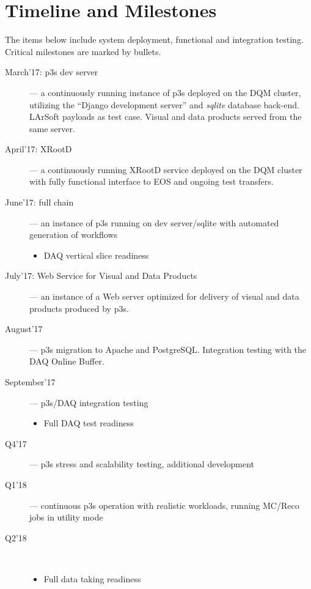 \documentclass[pdftex,12pt,letter]{article}
\begin{document}
\noindent 

\section{Timeline and Milestones}

The items below include system deployment, functional and integration testing.
Critical milestones are marked by bullets.

\begin{description}

\item[March'17: p3s dev server] --- a continuously running instance of p3s deployed on the DQM cluster,
utilizing the ``Django development server'' and \textit{sqlite} database back-end. LArSoft payloads as
test case. Visual and data products served from the same server.

\item[April'17: XRootD] --- a continuously running XRootD service deployed on the DQM cluster with
fully functional interface to EOS and ongoing test transfers.

\item[June'17: full chain] --- an instance of p3s running on dev server/sqlite with automated
generation of workflows
\begin{itemize}
\item DAQ vertical slice readiness
\end{itemize}

\item[July'17: Web Service for Visual and Data Products] --- an instance of a Web server optimized
for delivery of visual and data products produced by p3s.

\item[August'17] --- p3s migration to Apache and PostgreSQL. Integration testing with the
DAQ Online Buffer.

\item[September'17] --- p3s/DAQ integration testing
\begin{itemize}
\item Full DAQ test readiness
\end{itemize}

\item[Q4'17] --- p3s stress and scalability testing, additional development

\item[Q1'18] --- continuous p3s operation with realistic workloads, running
MC/Reco jobs in utility mode

\item[Q2'18]\ 
\begin{itemize}
\item Full data taking readiness
\end{itemize}

\end{description}
\end{document}
